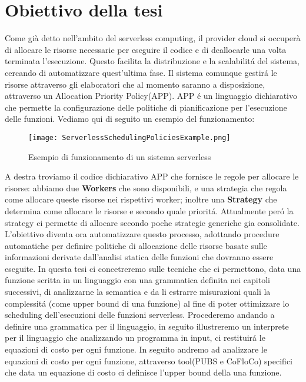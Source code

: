 \documentclass[../main.tex]{subfiles}
\begin{document}
\section{Obiettivo della tesi}
Come già detto nell'ambito del serverless computing, il provider cloud si occuperà di allocare le risorse necessarie per eseguire il codice e di deallocarle una volta terminata l'esecuzione. Questo facilita la distribuzione e la scalabilitá del sistema, cercando di automatizzare quest'ultima fase.
Il sistema comunque gestirá le risorse attraverso gli elaboratori che al momento saranno a disposizione, attraverso un Allocation Priority Policy(APP)\autocite{de2020allocation}.
APP é un linguaggio dichiarativo che permette la configurazione delle politiche di pianificazione per l'esecuzione delle funzioni.
Vediamo qui di seguito un esempio del funzionamento:
\begin{figure}[H]
   \centering
    \texttt{[image: ServerlessSchedulingPoliciesExample.png]}
    \caption{Esempio di funzionamento di un sistema serverless \autocite{deserverless}}
\end{figure}
A destra troviamo il codice dichiarativo APP che fornisce le regole per allocare le risorse: abbiamo due \textbf{Workers} che sono disponibili, e una strategia che regola come allocare queste risorse nei rispettivi worker; inoltre una \textbf{Strategy} che determina come allocare le risorse e secondo quale prioritá.
Attualmente peró la strategy ci permette di allocare secondo poche strategie generiche gia consolidate.
L'obiettivo diventa ora automatizzare questo processo, adottando procedure automatiche per definire politiche di allocazione delle risorse basate sulle informazioni derivate dall'analisi statica delle funzioni che dovranno essere eseguite.\autocite{deserverless}
In questa tesi ci concetreremo sulle tecniche che ci permettono, data una funzione scritta in un linguaggio con una grammatica definita nei capitoli successivi, di analizzarne la semantica e da li estrarre misurazioni quali la complessitá (come upper bound di una funzione) al fine di poter ottimizzare lo scheduling dell'esecuzioni delle funzioni serverless.
Procederemo andando a definire una grammatica per il linguaggio, in seguito illustreremo un interprete per il linguaggio che analizzando un programma in input, ci restituirá le equazioni di costo per ogni funzione.
In seguito andremo ad analizzare le equazioni di costo per ogni funzione, attraverso tool(PUBS \autocite{albert2008automatic} e CoFloCo\autocite{flores2014resource}) specifici che data un equazione di costo ci definisce l'upper bound della una funzione.
\end{document}
